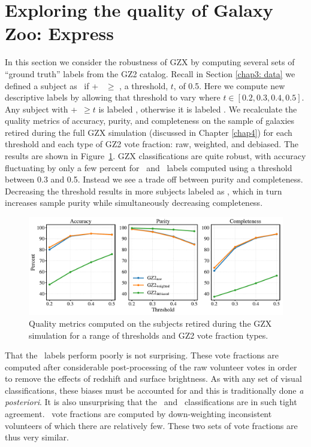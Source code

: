 \section{Exploring the quality of Galaxy Zoo: Express}
\label{chap3: vary threshold}

In this section we consider the robustness of GZX by computing several sets of ``ground truth'' labels from the GZ2 catalog. Recall in Section \ref{chap3: data} we defined a subject as \feat~if \ffeat+ \fstar~$\ge$ \fsmooth, a threshold, $t$, of 0.5. Here we compute new descriptive labels by allowing that threshold to vary where $t \in [0.2, 0.3, 0.4, 0.5]$.  Any subject with \ffeat+\fstar~$\ge t$ is labeled \feat, otherwise it is labeled \notfeat. We recalculate the quality metrics of accuracy, purity, and completeness on the sample of galaxies retired during the full GZX simulation (discussed in Chapter \ref{chap4}) for each threshold and each type of GZ2 vote fraction: raw, weighted, and debiased. The results are shown in Figure~\ref{fig: quality}. GZX classifications are quite robust, with accuracy fluctuating by only a few percent for \raw~and \weighted~labels computed using a threshold between 0.3 and 0.5. Instead we see a trade off between purity and completeness. Decreasing the threshold results in more subjects labeled as \feat, which in turn increases sample purity while simultaneously decreasing completeness.


\begin{figure}[t!]
\includegraphics[width=\textwidth]{Figures/human_machine/A1.pdf}
\caption{Quality metrics computed on the subjects retired during the GZX simulation for a range of thresholds and GZ2 vote fraction types. }
\label{fig: quality}
\end{figure}


That the \deb~labels perform poorly is not surprising. These vote fractions are computed after considerable post-processing of the raw volunteer votes in order to remove the effects of redshift and surface brightness. As with any set of visual classifications, these biases must be accounted for and this is traditionally done \textit{a posteriori}.  It is also unsurprising that the \raw~and \weighted~classifications are in such tight agreement. \weighted~vote fractions are computed by down-weighting inconsistent volunteers of which there are relatively few. These two sets of vote fractions are thus very similar.


